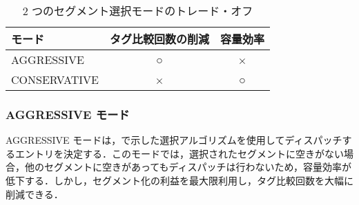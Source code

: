 \begin{table}[tb]
  \caption{2 つのセグメント選択モードのトレード・オフ}
  \footnotesize
  \center
   \begin{tabular}{l|c|c} \hline \hline
   モード & タグ比較回数の削減 & 容量効率 \\ \hline
   AGGRESSIVE & ○ & × \\
   CONSERVATIVE & × & ○ \\ \hline
  \end{tabular}
  \label{tab:switch_trade_off}
\end{table}

\subsubsection{AGGRESSIVE モード}
AGGRESSIVE モードは，で示した選択アルゴリズムを使用してディスパッチするエントリを決定する．このモードでは，選択されたセグメントに空きがない場合，他のセグメントに空きがあってもディスパッチは行わないため，容量効率が低下する．しかし，セグメント化の利益を最大限利用し，タグ比較回数を大幅に削減できる．

